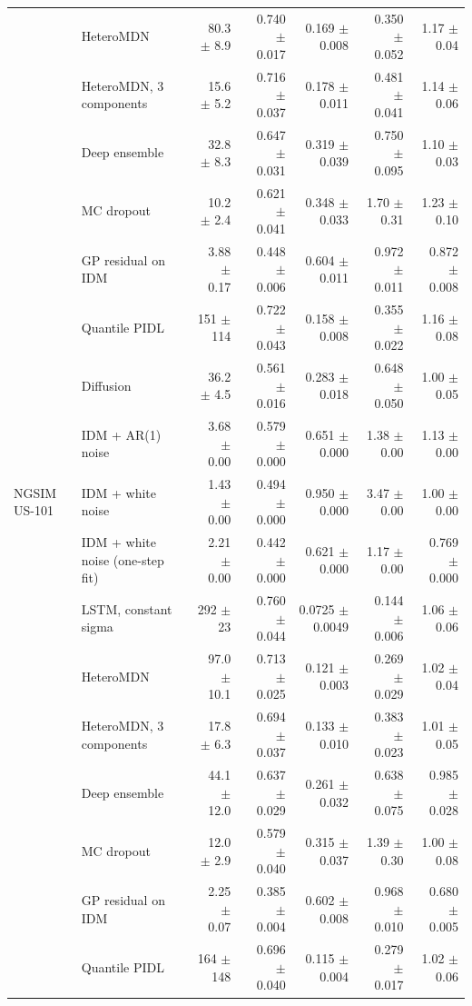 \begin{longtable}{llrrrrr}
 & HeteroMDN & 80.3 $\pm$ 8.9 & 0.740 $\pm$ 0.017 & 0.169 $\pm$ 0.008 & 0.350 $\pm$ 0.052 & 1.17 $\pm$ 0.04 \\
 & HeteroMDN, 3 components & 15.6 $\pm$ 5.2 & 0.716 $\pm$ 0.037 & 0.178 $\pm$ 0.011 & 0.481 $\pm$ 0.041 & 1.14 $\pm$ 0.06 \\
 & Deep ensemble & 32.8 $\pm$ 8.3 & 0.647 $\pm$ 0.031 & 0.319 $\pm$ 0.039 & 0.750 $\pm$ 0.095 & 1.10 $\pm$ 0.03 \\
 & MC dropout & 10.2 $\pm$ 2.4 & 0.621 $\pm$ 0.041 & 0.348 $\pm$ 0.033 & 1.70 $\pm$ 0.31 & 1.23 $\pm$ 0.10 \\
 & GP residual on IDM & 3.88 $\pm$ 0.17 & 0.448 $\pm$ 0.006 & 0.604 $\pm$ 0.011 & 0.972 $\pm$ 0.011 & 0.872 $\pm$ 0.008 \\
 & Quantile PIDL & 151 $\pm$ 114 & 0.722 $\pm$ 0.043 & 0.158 $\pm$ 0.008 & 0.355 $\pm$ 0.022 & 1.16 $\pm$ 0.08 \\
 & Diffusion & 36.2 $\pm$ 4.5 & 0.561 $\pm$ 0.016 & 0.283 $\pm$ 0.018 & 0.648 $\pm$ 0.050 & 1.00 $\pm$ 0.05 \\
 & IDM + AR(1) noise & 3.68 $\pm$ 0.00 & 0.579 $\pm$ 0.000 & 0.651 $\pm$ 0.000 & 1.38 $\pm$ 0.00 & 1.13 $\pm$ 0.00 \\
\midrule
NGSIM US-101 & IDM + white noise & 1.43 $\pm$ 0.00 & 0.494 $\pm$ 0.000 & 0.950 $\pm$ 0.000 & 3.47 $\pm$ 0.00 & 1.00 $\pm$ 0.00 \\
 & IDM + white noise (one-step fit) & 2.21 $\pm$ 0.00 & 0.442 $\pm$ 0.000 & 0.621 $\pm$ 0.000 & 1.17 $\pm$ 0.00 & 0.769 $\pm$ 0.000 \\
 & LSTM, constant sigma & 292 $\pm$ 23 & 0.760 $\pm$ 0.044 & 0.0725 $\pm$ 0.0049 & 0.144 $\pm$ 0.006 & 1.06 $\pm$ 0.06 \\
 & HeteroMDN & 97.0 $\pm$ 10.1 & 0.713 $\pm$ 0.025 & 0.121 $\pm$ 0.003 & 0.269 $\pm$ 0.029 & 1.02 $\pm$ 0.04 \\
 & HeteroMDN, 3 components & 17.8 $\pm$ 6.3 & 0.694 $\pm$ 0.037 & 0.133 $\pm$ 0.010 & 0.383 $\pm$ 0.023 & 1.01 $\pm$ 0.05 \\
 & Deep ensemble & 44.1 $\pm$ 12.0 & 0.637 $\pm$ 0.029 & 0.261 $\pm$ 0.032 & 0.638 $\pm$ 0.075 & 0.985 $\pm$ 0.028 \\
 & MC dropout & 12.0 $\pm$ 2.9 & 0.579 $\pm$ 0.040 & 0.315 $\pm$ 0.037 & 1.39 $\pm$ 0.30 & 1.00 $\pm$ 0.08 \\
 & GP residual on IDM & 2.25 $\pm$ 0.07 & 0.385 $\pm$ 0.004 & 0.602 $\pm$ 0.008 & 0.968 $\pm$ 0.010 & 0.680 $\pm$ 0.005 \\
 & Quantile PIDL & 164 $\pm$ 148 & 0.696 $\pm$ 0.040 & 0.115 $\pm$ 0.004 & 0.279 $\pm$ 0.017 & 1.02 $\pm$ 0.06 \\

\end{longtable}
